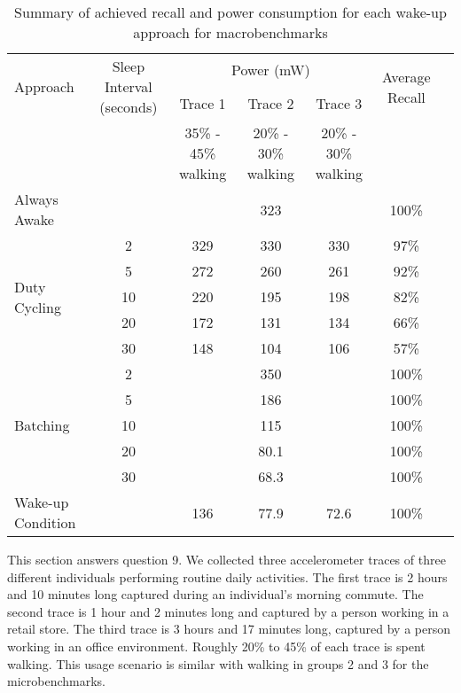 \begin{table*}[t]
    \begin{tabular}{|l|c|c|c|c|c|c|}
    \hline
	\multirow{2}{*}{Approach}		& \multirow{2}{*}{\parbox{2.2cm}{Sleep Interval (seconds)}}
												& \multicolumn{3}{c|}{\parbox{1.2cm}{Power (mW)}}
																								& \multirow{2}{*}{\parbox{1.5cm}{Average Recall}} \\ \cline{3-5}
									&			& Trace 1		& Trace 2		& Trace 3 		& 							\\ 
									&			& 35\% - 45\% walking	& 20\% - 30\% walking		& 20\% - 30\% walking		& \\ \hline
	Always Awake					& 			& \multicolumn{3}{c|}{323} 						& 100\% \\ \hline
	\multirow{5}{*}{Duty Cycling}	& 2			& 329			& 330			& 330			& 97\%	\\ \cline{2-6}
									& 5			& 272			& 260			& 261			& 92\%	\\ \cline{2-6}
									& 10		& 220			& 195			& 198			& 82\%	\\ \cline{2-6}
									& 20		& 172			& 131			& 134			& 66\%	\\ \cline{2-6}
									& 30		& 148			& 104			& 106			& 57\%	\\ \hline
	\multirow{5}{*}{Batching}		& 2			& \multicolumn{3}{c|}{350} 						& 100\% \\ \cline{2-6}
									& 5			& \multicolumn{3}{c|}{186} 						& 100\% \\ \cline{2-6}
	 								& 10		& \multicolumn{3}{c|}{115} 						& 100\% \\ \cline{2-6}
	 								& 20		& \multicolumn{3}{c|}{80.1} 					& 100\% \\ \cline{2-6}
	 								& 30		& \multicolumn{3}{c|}{68.3} 					& 100\% \\ \hline
	Wake-up Condition				&			& 136			& 77.9			& 72.6			& 100\% \\ \hline
    \end{tabular}
	\caption{Summary of achieved recall and power consumption for each wake-up approach for macrobenchmarks}
	\label{table:macrobenchmarks}
\end{table*}

This section answers question 9. We collected three accelerometer traces of three different individuals performing routine daily activities. The first trace is 2 hours and 10 minutes long captured during an individual's morning commute. The second trace is 1 hour and 2 minutes long and captured by a person working in a retail store. The third trace is 3 hours and 17 minutes long, captured by a person working in an office environment. Roughly 20\% to 45\% of each trace is spent walking. This usage scenario is similar with walking in groups 2 and 3 for the microbenchmarks. 

